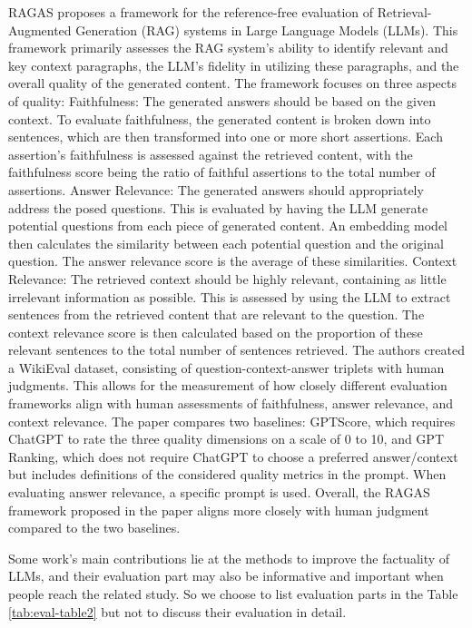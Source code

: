 RAGAS \citep{es2023ragas} proposes a framework for the reference-free evaluation of Retrieval-Augmented Generation (RAG) systems in Large Language Models (LLMs). This framework primarily assesses the RAG system's ability to identify relevant and key context paragraphs, the LLM's fidelity in utilizing these paragraphs, and the overall quality of the generated content. The framework focuses on three aspects of quality:
Faithfulness: The generated answers should be based on the given context. To evaluate faithfulness, the generated content is broken down into sentences, which are then transformed into one or more short assertions. Each assertion's faithfulness is assessed against the retrieved content, with the faithfulness score being the ratio of faithful assertions to the total number of assertions.
Answer Relevance: The generated answers should appropriately address the posed questions. This is evaluated by having the LLM generate potential questions from each piece of generated content. An embedding model then calculates the similarity between each potential question and the original question. The answer relevance score is the average of these similarities.
Context Relevance: The retrieved context should be highly relevant, containing as little irrelevant information as possible. This is assessed by using the LLM to extract sentences from the retrieved content that are relevant to the question. The context relevance score is then calculated based on the proportion of these relevant sentences to the total number of sentences retrieved.
The authors created a WikiEval dataset, consisting of question-context-answer triplets with human judgments. This allows for the measurement of how closely different evaluation frameworks align with human assessments of faithfulness, answer relevance, and context relevance. The paper compares two baselines: GPTScore, which requires ChatGPT to rate the three quality dimensions on a scale of 0 to 10, and GPT Ranking, which does not require ChatGPT to choose a preferred answer/context but includes definitions of the considered quality metrics in the prompt. When evaluating answer relevance, a specific prompt is used.
Overall, the RAGAS framework proposed in the paper aligns more closely with human judgment compared to the two baselines. 




Some work's main contributions lie at the methods to improve the factuality of LLMs, and their evaluation part may also be informative and important when people reach the related study. So we choose to list evaluation parts in the Table \ref{tab:eval-table2} but not to discuss their evaluation in detail.

